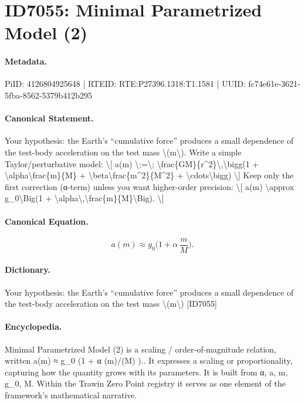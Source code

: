 \section*{ID7055: Minimal Parametrized Model (2)}
\paragraph{Metadata.}
PiID: 4126804925648 | RTEID: RTE:P27396.1318:T1.1581 | UUID: fc74e61e-3621-5fba-8562-5379b412b295

\paragraph{Canonical Statement.}
Your hypothesis: the Earth’s “cumulative force” produces a small dependence of the test-body acceleration on the test mass \textbackslash{}(m\textbackslash{}). Write a simple Taylor/perturbative model: \textbackslash{}[ a(m) \textbackslash{};=\textbackslash{}; \textbackslash{}frac\{GM\}\{r\textasciicircum{}2\}\textbackslash{},\textbackslash{}bigg(1 + \textbackslash{}alpha\textbackslash{}frac\{m\}\{M\} + \textbackslash{}beta\textbackslash{}frac\{m\textasciicircum{}2\}\{M\textasciicircum{}2\} + \textbackslash{}cdots\textbackslash{}bigg) \textbackslash{}] Keep only the first correction (α-term) unless you want higher-order precision: \textbackslash{}[ a(m) \textbackslash{}approx g\_0\textbackslash{}Big(1 + \textbackslash{}alpha\textbackslash{},\textbackslash{}frac\{m\}\{M\}\textbackslash{}Big). \textbackslash{}]

\paragraph{Canonical Equation.}
\[
a(m) \approx g_0\Big(1 + \alpha\,\frac{m}{M}\Big).
\]

\paragraph{Dictionary.}
Your hypothesis: the Earth’s “cumulative force” produces a small dependence of the test-body acceleration on the test mass \textbackslash{}(m\textbackslash{}) [ID7055]

\paragraph{Encyclopedia.}
Minimal Parametrized Model (2) is a scaling / order-of-magnitude relation, written a(m) ≈ g\_0 (1 + α (m)/(M) ).. It expresses a scaling or proportionality, capturing how the quantity grows with its parameters. It is built from α, a, m, g\_0, M. Within the Trawin Zero Point registry it serves as one element of the framework's mathematical narrative.
